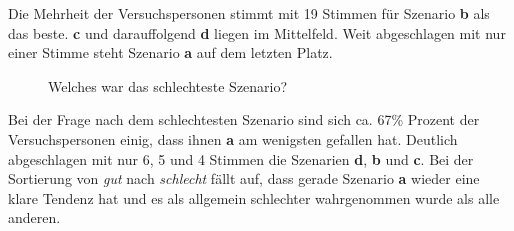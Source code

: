 \documentclass{Paper}
\begin{document}
Die Mehrheit der Versuchspersonen stimmt mit 19 Stimmen für Szenario \textbf{b} als das beste. \textbf{c} und darauffolgend \textbf{d} liegen im Mittelfeld. Weit abgeschlagen mit nur einer Stimme steht Szenario \textbf{a} auf dem letzten Platz.
       
       
        \begin{figure}[ht]
\caption{Welches war das schlechteste Szenario?}
\label{SzenarioSchlecht}
\end{figure}
       

Bei der Frage nach dem schlechtesten Szenario sind sich ca. 67\% Prozent der Versuchspersonen einig, dass ihnen \textbf{a} am wenigsten gefallen hat. Deutlich abgeschlagen mit nur 6, 5 und 4 Stimmen die Szenarien \textbf{d}, \textbf{b} und \textbf{c}.
Bei der Sortierung von \textit{gut} nach \textit{schlecht} fällt auf, dass gerade Szenario \textbf{a} wieder eine klare Tendenz hat und es als allgemein schlechter wahrgenommen wurde als alle anderen.
\end{document}

